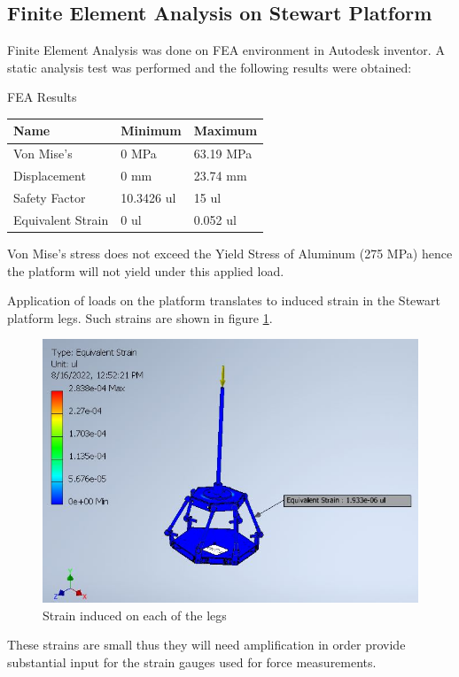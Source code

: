 \subsection{Finite Element Analysis on Stewart Platform}
Finite Element Analysis was done on FEA environment in Autodesk inventor. A static analysis test was performed and the following results were obtained:
\begin{table}[H]
\caption{FEA Results}
\end{table}
\begin{center}
\begin{tabular}{|l|l|l|}
\hline
\textbf{Name} & \textbf{Minimum} & \textbf{Maximum}\\
\hline
Von Mise's & 0 MPa & 63.19 MPa\\
\hline
Displacement & 0 mm & 23.74 mm\\
\hline
Safety Factor & 10.3426 ul & 15 ul\\
\hline
Equivalent Strain & 0 ul & 0.052 ul\\
\hline
\end{tabular}
\end{center}
Von Mise's stress does not exceed the Yield Stress of Aluminum (275 MPa) hence the platform will not yield under this applied load.

Application of loads on the platform translates to induced strain in the Stewart platform legs. Such strains are shown in figure \ref{eq}.
\begin{center}
	\begin{figure}[H]
	\centering
	\includegraphics[width=0.6\linewidth]{Figures/Equivalent}
	\caption[Equivalent strain]{Strain induced on each of the legs}
	\label{eq}
	\end{figure}
\end{center}
These strains are small thus they will need amplification in order provide substantial input for the strain gauges used for force measurements. 

